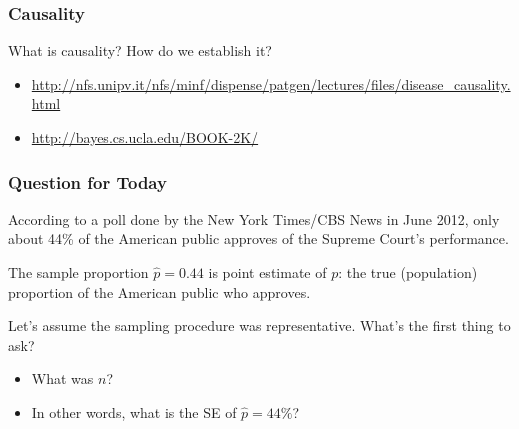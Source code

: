 \documentclass[slides]{beamer}
\newcommand{\blue}[1]{\textcolor{blue2}{#1}}
\newcommand{\phat}{\widehat{p}}
\begin{document}
\begin{frame}[fragile]
\frametitle{Causality}

What is causality?  How do we establish it?  

\begin{itemize}
\item \blue{\url{http://nfs.unipv.it/nfs/minf/dispense/patgen/lectures/files/disease_causality.html}}
\item \blue{\url{http://bayes.cs.ucla.edu/BOOK-2K/}}
\end{itemize}


\end{frame}







\begin{frame}[fragile]
\frametitle{Question for Today}

According to a poll done by the New York Times/CBS News in June 2012, only about 44\% of the American public approves of the Supreme Court's performance.  

\vspace{0.25cm}

\pause The sample proportion $\phat=0.44$ is \blue{point estimate} of $p$: the true (population) proportion of the American public who approves.  

\vspace{0.25cm}

\pause Let's assume the sampling procedure was representative.  What's the first thing to ask?

\vspace{0.25cm}

\begin{itemize}
\item What was $n$?
\item In other words, what is the \blue{SE} of $\phat=44\%$?
\end{itemize}

\end{frame}
\end{document}
